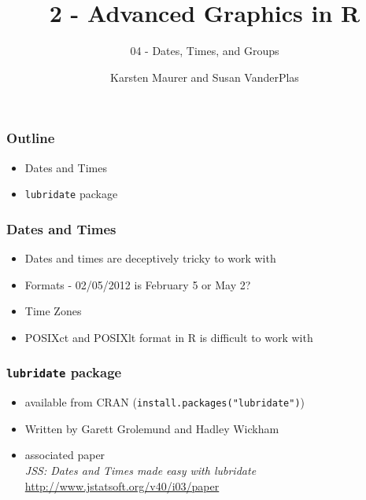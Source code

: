 \documentclass{beamer}\usepackage[]{graphicx}\usepackage[]{color}
\title[2-Graphics]{2 - Advanced Graphics in R}
\subtitle{04 - Dates, Times, and Groups}
\author[ K. Maurer, S. VanderPlas]{Karsten Maurer and Susan VanderPlas}
\date{}
\institute[ISU]{Iowa State University}
\begin{document}
\begin{frame}
\maketitle
\end{frame}




\begin{frame}
\frametitle{Outline}
\begin{itemize}
\item Dates and Times
\item \texttt{lubridate} package
\end{itemize}
\end{frame}


\begin{frame}
\frametitle{Dates and Times}
\begin{itemize}
\item Dates and times are deceptively tricky to work with\medskip
\item Formats - 02/05/2012 is February 5 or May 2? \medskip
\item Time Zones\medskip
\item POSIXct and POSIXlt format in R is difficult to work with
\end{itemize}
\end{frame}

\begin{frame}
\frametitle{\texttt{lubridate} package}
\begin{itemize}
\item available from CRAN (\texttt{install.packages("lubridate")})\medskip
\item Written by Garett Grolemund and Hadley Wickham\medskip
\item associated paper\\\emph{JSS: Dates and Times made easy with lubridate}\\\url{http://www.jstatsoft.org/v40/i03/paper
}
\end{itemize}
\end{frame}
\end{document}
